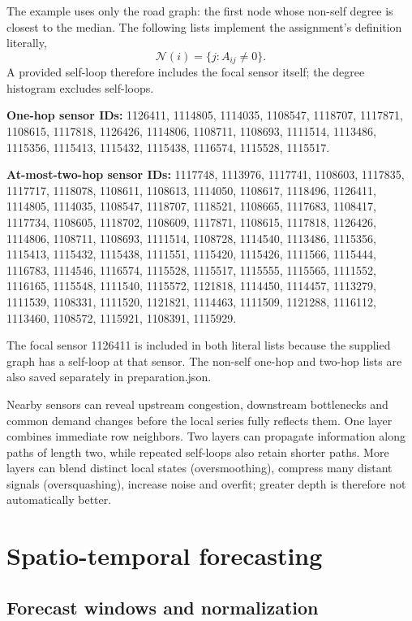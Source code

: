 \documentclass[11pt,a4paper]{article}
\begin{document}
The example uses only the road graph: the first node whose non-self degree is closest to the median. The following lists implement the assignment's definition literally,
\begin{equation}\mathcal N(i)=\{j:A_{ij}\ne0\}.\end{equation}
A provided self-loop therefore includes the focal sensor itself; the degree histogram excludes self-loops.


\textbf{One-hop sensor IDs:} 1126411, 1114805, 1114035, 1108547, 1118707, 1117871, 1108615, 1117818, 1126426, 1114806, 1108711, 1108693, 1111514, 1113486, 1115356, 1115413, 1115432, 1115438, 1116574, 1115528, 1115517.


\textbf{At-most-two-hop sensor IDs:} 1117748, 1113976, 1117741, 1108603, 1117835, 1117717, 1118078, 1108611, 1108613, 1114050, 1108617, 1118496, 1126411, 1114805, 1114035, 1108547, 1118707, 1118521, 1108665, 1117683, 1108417, 1117734, 1108605, 1118702, 1108609, 1117871, 1108615, 1117818, 1126426, 1114806, 1108711, 1108693, 1111514, 1108728, 1114540, 1113486, 1115356, 1115413, 1115432, 1115438, 1111551, 1115420, 1115426, 1111566, 1115444, 1116783, 1114546, 1116574, 1115528, 1115517, 1115555, 1115565, 1111552, 1116165, 1115548, 1111540, 1115572, 1121818, 1114450, 1114457, 1113279, 1111539, 1108331, 1111520, 1121821, 1114463, 1111509, 1121288, 1116112, 1113460, 1108572, 1115921, 1108391, 1115929.


The focal sensor 1126411 is included in both literal lists because the supplied graph has a self-loop at that sensor. The non-self one-hop and two-hop lists are also saved separately in preparation.json.


Nearby sensors can reveal upstream congestion, downstream bottlenecks and common demand changes before the local series fully reflects them. One layer combines immediate row neighbors. Two layers can propagate information along paths of length two, while repeated self-loops also retain shorter paths. More layers can blend distinct local states (oversmoothing), compress many distant signals (oversquashing), increase noise and overfit; greater depth is therefore not automatically better.


\FloatBarrier\section{Spatio-temporal forecasting}\label{sec:q4}
\subsection{Forecast windows and normalization}
\end{document}

